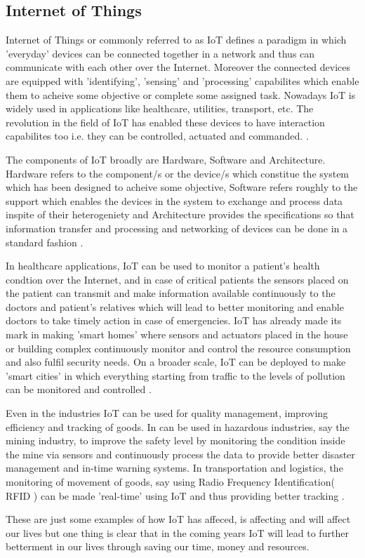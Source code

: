 \documentclass[12pt]{article}
\theoremstyle{definition}
\begin{document}
  \subsection{Internet of Things}
  Internet of Things or commonly referred to as IoT defines a paradigm in which 'everyday' devices can be connected 
  together in a network and thus can communicate with each other over the Internet. Moreover the connected devices are equipped 
  with 'identifying', 'sensing' and 'processing' \cite{Whitmore-survey}
  capabilites which enable them to 
  acheive some objective or complete some assigned task. Nowadays IoT is widely used in applications like
  healthcare, utilities, transport, etc. The revolution in the field of IoT has enabled
  these devices to have interaction capabilites too i.e. they can be controlled, actuated and commanded.
  \cite{Gubbi-vision}. 
  \par The components of IoT broadly are Hardware, Software and Architecture. Hardware refers to the component/s
  or the device/s which constitue the system which has been designed to acheive some objective, Software refers roughly
  to the support which enables the devices in the system to exchange and process data inspite of their heterogeniety 
   and Architecture provides the specifications so that information transfer and processing
   and networking of devices can be done in a standard fashion  \cite{Whitmore-survey} \cite{Gubbi-vision}.
  \par In healthcare applications, IoT can be used to monitor a patient's health condtion over the Internet, and 
  in case of critical patients the sensors placed on the patient can transmit and make information available continuously
  to the doctors and patient's relatives which will lead to better monitoring and enable doctors to take timely action
  in case of emergencies. IoT has already made its mark in making 'smart homes' where sensors and actuators placed in 
  the house or building complex continuously monitor and control the resource consumption and also fulfil security needs.
  On a broader scale, IoT can be deployed to make 'smart cities' in which everything starting from traffic to the levels 
  of pollution can be monitored and controlled \cite{Whitmore-survey}. 
  \par Even in the industries IoT can be used for quality management, improving efficiency and tracking of goods. 
  In can be used in hazardous industries, say the mining industry, to improve the safety level
  by monitoring the condition inside the mine via sensors and continuously process the data to provide better disaster
  management and in-time warning systems. In transportation and logistics, the monitoring of movement of goods, say 
  using Radio Frequency Identification( RFID ) can be 
  made 'real-time' using IoT and thus providing better tracking \cite{Gubbi-vision}.
  \par These are just some examples of how IoT has affeced, is affecting and will affect our lives but one thing is clear
  that in the coming years IoT will lead to further betterment  in our lives through saving our time, money and resources.
\end{document}
